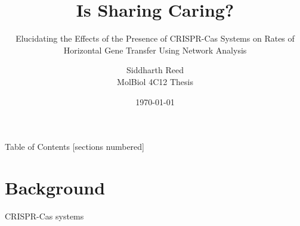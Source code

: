 \documentclass[dvipsnames]{beamer}
\title{{\fontsize{40}{50}\selectfont Is Sharing Caring?}}
\subtitle{\vspace{-0.2in}Elucidating the Effects of the Presence of CRISPR-Cas Systems on Rates of Horizontal Gene Transfer Using Network Analysis\vspace{0.1in}}
\date{\today}
\author{Siddharth Reed\\
        MolBiol 4C12 Thesis
       }
\institute{Golding Lab,\\
           Biology Department,\\
           McMaster University
          }
\begin{document}
\watermarkoff %
\begin{frame}[t,plain]
    \titlepage
\end{frame}
\begin{frame}[plain]{Table of Contents}
  [sections numbered]
  \tableofcontents[hideallsubsections]
  \addtocounter{framenumber}{-1}
\end{frame}
\section{Background}
\begin{frame}{}%
    \begin{center}
        \Huge \textcolor{OliveGreen}{CRISPR-Cas systems}
    \end{center}
    \addtocounter{framenumber}{-1}
\end{frame}
\end{document}
